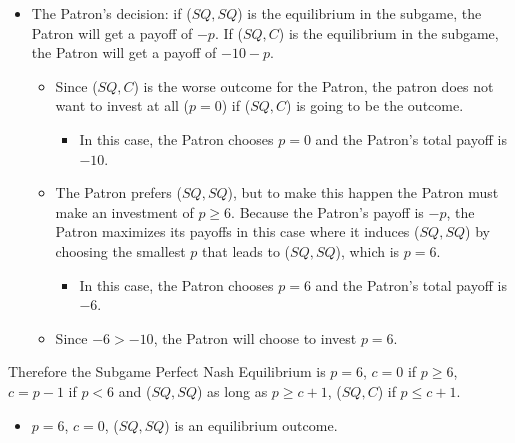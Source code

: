 \documentclass[12pt]{article}
\begin{document}
\begin{itemize}
\begin{itemize}
		\end{itemize}
	\item The Patron's decision: if ($SQ,SQ$) is the equilibrium in the subgame, the Patron will get a payoff of $-p$. If ($SQ,C$) is the equilibrium in the subgame, the Patron will get a payoff of $-10-p$.
		\begin{itemize}
			\item Since ($SQ,C$) is the worse outcome for the Patron, the patron does not want to invest at all ($p=0$) if ($SQ,C$) is going to be the outcome. 
				\begin{itemize}
					\item In this case, the Patron chooses $p=0$ and the Patron's total payoff is $-10$.
				\end{itemize}
			\item The Patron prefers ($SQ,SQ$), but to make this happen the Patron must make an investment of $p \geq 6$. Because the Patron's payoff is $-p$, the Patron maximizes its payoffs in this case where it induces ($SQ,SQ$) by choosing the smallest $p$ that leads to ($SQ,SQ$), which is $p=6$. 
				\begin{itemize}
					\item In this case, the Patron chooses $p=6$ and the Patron's total payoff is $-6$.
				\end{itemize}
			\item Since $-6 > -10$, the Patron will choose to invest $p=6$.
		\end{itemize}
\end{itemize}
Therefore the Subgame Perfect Nash Equilibrium is $p=6$, $c = 0$ if $p \geq 6$, $c = p-1$ if $p < 6$ and ($SQ,SQ$) as long as $p \geq c+1$, ($SQ,C$) if $p \leq c+ 1$.
\begin{itemize}
	\item $p=6$, $c = 0$, ($SQ,SQ$) is an equilibrium outcome.
\end{itemize}
		
\end{document}
